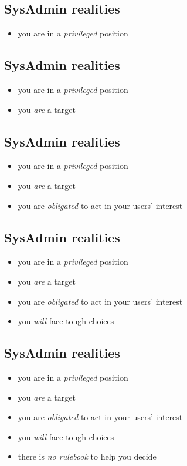 \documentclass[xga]{xdvislides}
\begin{document}
\subsection{SysAdmin realities}
\begin{itemize}
	\item you are in a {\em privileged} position
\end{itemize}

\subsection{SysAdmin realities}
\begin{itemize}
	\item you are in a {\em privileged} position
	\item you {\em are} a target
\end{itemize}

\subsection{SysAdmin realities}
\begin{itemize}
	\item you are in a {\em privileged} position
	\item you {\em are} a target
	\item you are {\em obligated} to act in your users' interest
\end{itemize}

\subsection{SysAdmin realities}
\begin{itemize}
	\item you are in a {\em privileged} position
	\item you {\em are} a target
	\item you are {\em obligated} to act in your users' interest
	\item you {\em will} face tough choices
\end{itemize}

\subsection{SysAdmin realities}
\begin{itemize}
	\item you are in a {\em privileged} position
	\item you {\em are} a target
	\item you are {\em obligated} to act in your users' interest
	\item you {\em will} face tough choices
	\item there is {\em no rulebook} to help you decide
\end{itemize}
\end{document}
